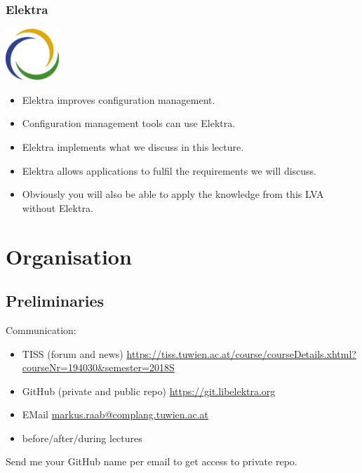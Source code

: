 \documentclass{beamer}
\begin{document}
\begin{frame}
	\frametitle{Elektra}
	\hfill \includegraphics[width=2cm]{../figures/logo}
	\vspace{-1cm}
	\begin{itemize}
		\item Elektra improves configuration management.
		\item Configuration management tools can use Elektra.
		\item Elektra implements what we discuss in this lecture.
		\item Elektra allows applications to fulfil the requirements we will discuss.
		\item Obviously you will also be able to apply the knowledge from this LVA without Elektra.
	\end{itemize}
\end{frame}





\section{Organisation}

\subsection{Preliminaries}
\begin{frame}
	Communication:
	\begin{itemize}
		\item TISS (forum and news) \url{https://tiss.tuwien.ac.at/course/courseDetails.xhtml?courseNr=194030&semester=2018S}
		\item GitHub (private and public repo) \url{https://git.libelektra.org}
		\item EMail \url{markus.raab@complang.tuwien.ac.at}
		\item before/after/during lectures
	\end{itemize}
\end{frame}

\begin{assignment}
	\begin{task}
	Send me your GitHub name per email to get access to private repo.
	\end{task}
\end{assignment}
\end{document}
